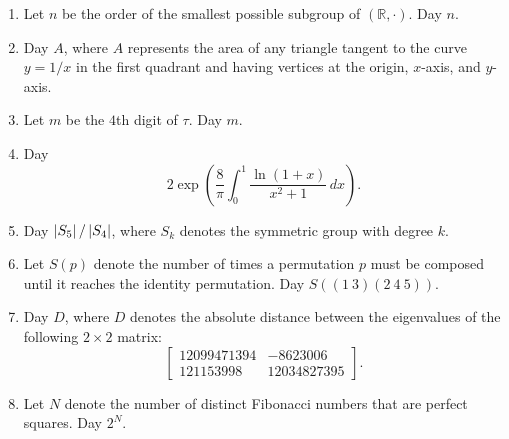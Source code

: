 \begin{enumerate}
    \item Let \( n \) be the order of the smallest possible subgroup of \( \left( \mathbb{R}, \cdot \right) \). Day \( n \).

    \item Day \( A \), where \( A \) represents the area of any triangle
        tangent to the curve \( y = 1 / x \) in the first quadrant and having
        vertices at the origin, \( x \)-axis, and \( y \)-axis.

    \item Let \( m \) be the \( 4 \)th digit of \( \tau \). Day \( m \). 

    \item Day
        \[
            2 \exp{\left( \frac{8}{\pi} \int_{ 0 }^{ 1 } \frac{\ln{\left( 1 + x \right)}}{x^2 + 1} \, dx \right)}
        .\]
        
    \item Day \( \left\lvert S_5 \right\rvert / \left\lvert S_4 \right\rvert \), where \( S_k \) denotes the
        symmetric group with degree \( k \).

    \item Let \( S \left( p \right) \) denote the number of times a permutation
        \( p \) must be composed until it reaches the identity permutation.
        Day \( S \left( \left( 1 \: 3 \right) \left( 2 \: 4 \: 5 \right) \right) \).

    \item Day \( D \), where \( D \) denotes the absolute distance between the
        eigenvalues of the following \( 2 \times 2 \) matrix:
        \[
            \begin{bmatrix}
                12099471394 & -8623006 \\
                121153998 & 12034827395
            \end{bmatrix}
        .\]

    \item Let \( N \) denote the number of distinct Fibonacci numbers that are perfect squares. Day \( 2^N \).


\end{enumerate}
